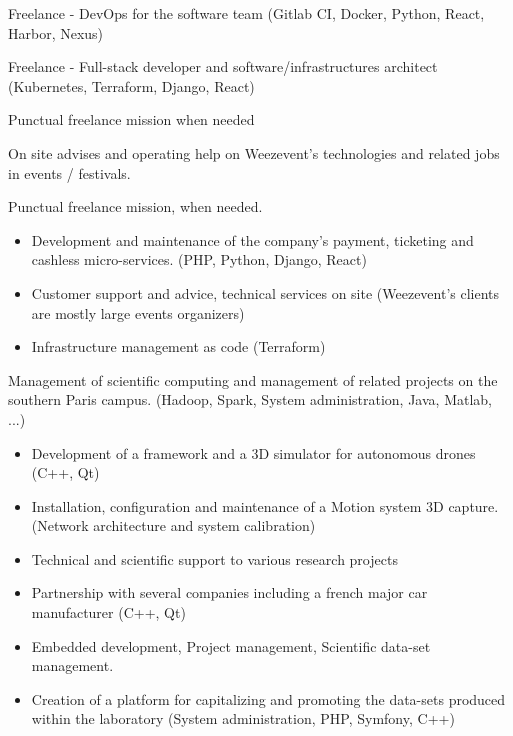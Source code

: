 

Freelance - DevOps for the software team (Gitlab CI, Docker, Python, React, Harbor, Nexus)

\divider

Freelance - Full-stack developer and software/infrastructures architect (Kubernetes, Terraform, Django, React)

Punctual freelance mission when needed

\divider

On site advises and operating help on Weezevent's technologies and related jobs in events / festivals.

Punctual freelance mission, when needed.

\divider

\begin{itemize}
    \item Development and maintenance of the company's payment, ticketing and cashless micro-services. (PHP, Python, Django, React)
    \item Customer support and advice, technical services on site (Weezevent's clients are mostly large events organizers)
    \item Infrastructure management as code (Terraform)
\end{itemize}

\divider

Management of scientific computing and management of related projects on the southern Paris campus. (Hadoop, Spark, System administration, Java, Matlab, ...)

\divider

\begin{itemize}
    \item Development of a framework and a 3D simulator for autonomous drones (C++, Qt)
    \item Installation, configuration and maintenance of a Motion system 3D capture. (Network architecture and system calibration)
    \item Technical and scientific support to various research projects
    \item Partnership with several companies including a french major car manufacturer (C++, Qt)
    \item Embedded development, Project management, Scientific data-set management.
    \item Creation of a platform for capitalizing and promoting the data-sets produced within the laboratory (System administration, PHP, Symfony, C++)
\end{itemize}